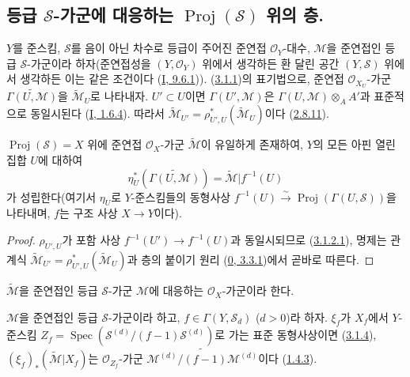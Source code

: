 \subsection{등급 $\mathcal{S}$-가군에 대응하는
$\operatorname{Proj}(\mathcal{S})$ 위의 층.}
\label{subsection:II.3.2-ko}

\begin{env}[3.2.1]
\label{II.3.2.1-ko}
$Y$를 준스킴, $\mathcal{S}$를 음이 아닌 차수로 등급이 주어진 준연접
$\mathcal{O}_Y$-대수, $\mathcal{M}$을 준연접인 등급 $\mathcal{S}$-가군이라
하자(준연접성을 $(Y,\mathcal{O}_Y)$ 위에서 생각하든 환 달린 공간
$(Y,\mathcal{S})$ 위에서 생각하든 이는 같은 조건이다
(\hyperref[I.9.6.1-ko]{I, 9.6.1})).
(\hyperref[II.3.1.1-ko]{3.1.1})의 표기법으로, 준연접
$\mathcal{O}_{X_U}$-가군 $\widetilde{\Gamma(U,\mathcal{M})}$을
$\widetilde{\mathcal{M}}_U$로 나타내자. $U'\subset U$이면
$\Gamma(U',\mathcal{M})$은
$\Gamma(U,\mathcal{M})\otimes_A A'$과 표준적으로 동일시된다
(\hyperref[I.1.6.4-ko]{I, 1.6.4}). 따라서
$\widetilde{\mathcal{M}}_{U'}
=\rho_{U',U}^*(\widetilde{\mathcal{M}}_U)$이다
(\hyperref[II.2.8.11-ko]{2.8.11}).
\end{env}

\begin{proposition}[3.2.2]
\label{II.3.2.2-ko}
$\operatorname{Proj}(\mathcal{S})=X$ 위에 준연접
$\mathcal{O}_X$-가군 $\widetilde{\mathcal{M}}$이 유일하게 존재하여,
$Y$의 모든 아핀 열린집합 $U$에 대하여
\[
  \eta_U^*(\widetilde{\Gamma(U,\mathcal{M})})
  =\widetilde{\mathcal{M}}|f^{-1}(U)
\]
가 성립한다(여기서 $\eta_U$로 $Y$-준스킴들의 동형사상
$f^{-1}(U)\xrightarrow{\sim}\operatorname{Proj}(\Gamma(U,\mathcal{S}))$을
나타내며, $f$는 구조 사상 $X\to Y$이다).
\end{proposition}

\begin{proof}
$\rho_{U',U}$가 포함 사상 $f^{-1}(U')\to f^{-1}(U)$과 동일시되므로
(\hyperref[II.3.1.2.1-ko]{3.1.2.1}), 명제는 관계식
$\widetilde{\mathcal{M}}_{U'}=\rho_{U',U}^*(\widetilde{\mathcal{M}}_U)$과
층의 붙이기 원리 (\hyperref[0.3.3.1-ko]{0, 3.3.1})에서 곧바로 따른다.
\end{proof}

$\widetilde{\mathcal{M}}$을 준연접인 등급 $\mathcal{S}$-가군
$\mathcal{M}$에 대응하는 $\mathcal{O}_X$-가군이라 한다.

\begin{proposition}[3.2.3]
\label{II.3.2.3-ko}
$\mathcal{M}$을 준연접인 등급 $\mathcal{S}$-가군이라 하고,
$f\in\Gamma(Y,\mathcal{S}_d)$ ($d>0$)라 하자. $\xi_f$가 $X_f$에서
$Y$-준스킴
$Z_f=\operatorname{Spec}(\mathcal{S}^{(d)}/(f-1)\mathcal{S}^{(d)})$로
가는 표준 동형사상이면 (\hyperref[II.3.1.4-ko]{3.1.4}),
$(\xi_f)_*(\widetilde{\mathcal{M}}|X_f)$는 $\mathcal{O}_{Z_f}$-가군
$\widetilde{\mathcal{M}^{(d)}/(f-1)\mathcal{M}^{(d)}}$이다
(\hyperref[II.1.4.3-ko]{1.4.3}).
\end{proposition}


